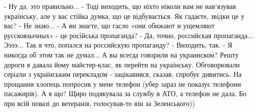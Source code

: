 - Ну да, это правильно...
- Тоді виходить, що ніхто ніколи вам не нав‘язував українську, але у вас стійка думка, що це відбувається. Як гадаєте, звідки це у вас?
- Не знаю...
- А ви знаєте, що гасло «они обижают и ущемляют русскоязычных» - це російська пропаганда?
- Да, точно, российская пропаганда... Ээээ... Так я что, попался на российскую пропаганду?
- Виходить, так.
- Я никогда об этом так не думал... А вы всегда говорили на украинском?
Решту дороги я давала йому майстер-клас, як перейти на українську. Обговорювали серіали з українським перекладом - зацікавився, сказав, спробує дивитись. 
На прощання хлопець попросив у мене телефон (убер зараз не показує телефони пасажирів). А я що? Щиро подякувала за службу в АТО, а телефон не дала. Бо при всій повазі до ветеранів, голосував-то він за Зеленського))

